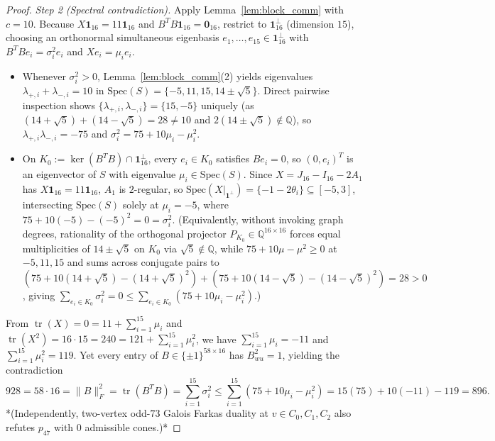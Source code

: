 \documentclass[11pt,reqno]{amsart}
\theoremstyle{definition}
\theoremstyle{remark}
\numberwithin{equation}{section}
\numberwithin{table}{section}
\DeclareMathOperator{\tr}{tr}
\begin{document}
\begin{proof}
\emph{Step 2 (Spectral contradiction).}
Apply Lemma~\ref{lem:block_comm} with $c = 10$. Because $X\mathbf{1}_{16} = 11\mathbf{1}_{16}$ and $B^T B \mathbf{1}_{16} = \mathbf{0}_{16}$, restrict to $\mathbf{1}_{16}^\perp$ (dimension $15$), choosing an orthonormal simultaneous eigenbasis $e_1, \dots, e_{15} \in \mathbf{1}_{16}^\perp$ with $B^T B e_i = \sigma_i^2 e_i$ and $X e_i = \mu_i e_i$.
\begin{itemize}
  \item Whenever $\sigma_i^2 > 0$, Lemma~\ref{lem:block_comm}(2) yields eigenvalues $\lambda_{+,i} + \lambda_{-,i} = 10$ in $\mathrm{Spec}(S) = \{-5, 11, 15, 14 \pm \sqrt{5}\}$. Direct pairwise inspection shows $\{\lambda_{+,i}, \lambda_{-,i}\} = \{15, -5\}$ uniquely (as $(14+\sqrt{5}) + (14-\sqrt{5}) = 28 \neq 10$ and $2(14 \pm \sqrt{5}) \notin \mathbb{Q}$), so $\lambda_{+,i}\lambda_{-,i} = -75$ and $\sigma_i^2 = 75 + 10\mu_i - \mu_i^2$.
  \item On $K_0 := \ker(B^T B) \cap \mathbf{1}_{16}^\perp$, every $e_i \in K_0$ satisfies $Be_i = 0$, so $(0, e_i)^T$ is an eigenvector of $S$ with eigenvalue $\mu_i \in \mathrm{Spec}(S)$. Since $X = J_{16} - I_{16} - 2A_1$ has $X\mathbf{1}_{16} = 11\mathbf{1}_{16}$, $A_1$ is $2$-regular, so $\mathrm{Spec}(X|_{\mathbf{1}^\perp}) = \{-1 - 2\theta_i\} \subseteq [-5, 3]$, intersecting $\mathrm{Spec}(S)$ solely at $\mu_i = -5$, where $75 + 10(-5) - (-5)^2 = 0 = \sigma_i^2$. (Equivalently, without invoking graph degrees, rationality of the orthogonal projector $P_{K_0} \in \mathbb{Q}^{16 \times 16}$ forces equal multiplicities of $14 \pm \sqrt{5}$ on $K_0$ via $\sqrt{5} \notin \mathbb{Q}$, while $75+10\mu-\mu^2 \ge 0$ at $-5, 11, 15$ and sums across conjugate pairs to $(75+10(14+\sqrt{5})-(14+\sqrt{5})^2) + (75+10(14-\sqrt{5})-(14-\sqrt{5})^2) = 28 > 0$, giving $\sum_{e_i \in K_0} \sigma_i^2 = 0 \le \sum_{e_i \in K_0} (75 + 10\mu_i - \mu_i^2)$.)
\end{itemize}
From $\tr(X) = 0 = 11 + \sum_{i=1}^{15} \mu_i$ and $\tr(X^2) = 16 \cdot 15 = 240 = 121 + \sum_{i=1}^{15} \mu_i^2$, we have $\sum_{i=1}^{15} \mu_i = -11$ and $\sum_{i=1}^{15} \mu_i^2 = 119$. Yet every entry of $B \in \{\pm 1\}^{58 \times 16}$ has $B_{wu}^2 = 1$, yielding the contradiction
\[
  928 = 58 \cdot 16 = \|B\|_F^2 = \tr(B^T B) = \sum_{i=1}^{15} \sigma_i^2 \le \sum_{i=1}^{15} (75 + 10\mu_i - \mu_i^2) = 15(75) + 10(-11) - 119 = 896.
\]
*(Independently, two-vertex odd-$73$ Galois Farkas duality at $v \in C_0, C_1, C_2$ also refutes $p_{47}$ with $0$ admissible cones.)*
\end{proof}
\end{document}
